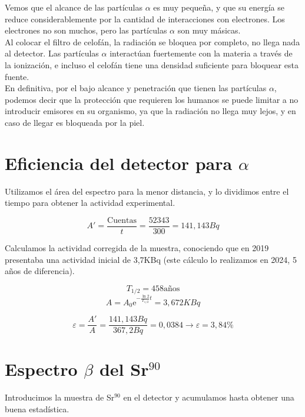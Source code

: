 \documentclass[a4paper,12pt,spanish]{article}
\begin{document}
	
	Vemos que el alcance de las partículas $\alpha$ es muy pequeña, y que su energía se reduce considerablemente por la cantidad de interacciones con electrones. Los electrones no son muchos, pero las partículas $\alpha$ son muy másicas.\\
	
	
	
	Al colocar el filtro de celofán, la radiación se bloquea por completo, no llega nada al detector.
	Las partículas $\alpha$ interactúan fuertemente con la materia a través de la ionización, e incluso el celofán tiene una densidad suficiente para bloquear esta fuente.\\
	
	
	En definitiva, por el bajo alcance y penetración que tienen las partículas $\alpha$, podemos decir que la protección que requieren los humanos se puede limitar a no introducir emisores en su organismo, ya que la radiación no llega muy lejos, y en caso de llegar es bloqueada por la piel.
	
	
	\section{Eficiencia del detector para $\alpha$}
	
	Utilizamos el área del espectro para la menor distancia, y lo dividimos entre el tiempo para obtener la actividad experimental.
	
	\[A' = \frac{\text{Cuentas}}{t}= \frac{52343}{300} = 141,143 \si{Bq}\]
	
	Calculamos la actividad corregida de la muestra, conociendo que en 2019 presentaba una actividad inicial de 3,7KBq (este cálculo lo realizamos en 2024, 5 años de diferencia).
	
	\[T_{1/2}= 458 \text{años}\]
	\[A = A_0 \text{e}^{-\frac{\ln 2}{T_{1/2} } t} = 3,672 \si{KBq}\]

	
	
	\[\varepsilon = \frac{A'}{A} = \frac{141,143\si{Bq}}{367,2 \si{Bq} }= 0,0384  \longrightarrow \varepsilon =  3,84\%
	\]
	
	 \vspace{\baselineskip}
	
	\section{Espectro $\beta$ del Sr$^{90}$}
	
	Introducimos la muestra de Sr$^{90}$ en el detector y acumulamos hasta obtener una buena estadística.
	
\end{document}
